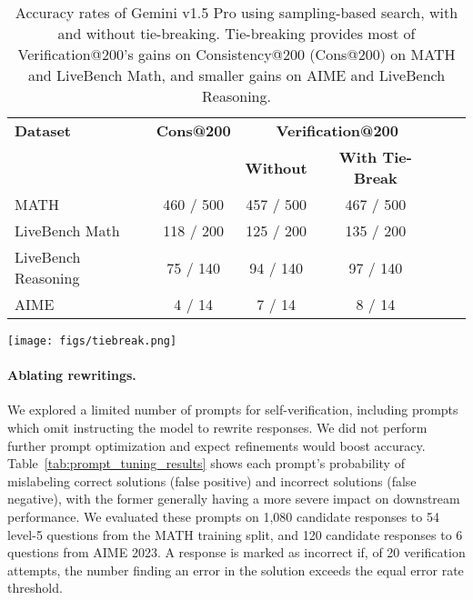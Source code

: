 \begin{table}[htbp]
\centering
\begin{minipage}[c]{0.68\textwidth}
\vspace{0cm}
\begin{tabular}{lccccc}
\toprule
\textbf{Dataset} & \textbf{Cons@200} & \multicolumn{2}{c}{\textbf{Verification@200}} \\
                 &                   & \textbf{Without} & \textbf{With Tie-Break} \\
\midrule
MATH              & {460} / {500}   & {457} / {500}   & {467} / {500} \\
LiveBench Math        & {118} / {200}   & {125} / {200}   & {135} / {200} \\
LiveBench Reasoning & {75} / {140}    & {94} / {140}    & {97} / {140} \\
AIME              & {4} / {14}      & {7} / {14}      & {8} / {14}   \\
\bottomrule
\end{tabular}
\end{minipage}
\hfill
\begin{minipage}[c]{0.31\textwidth}
\vspace{0cm}
\texttt{[image: figs/tiebreak.png]}
\end{minipage}

\caption{Accuracy rates of Gemini v1.5 Pro using sampling-based search, with and without tie-breaking.
Tie-breaking provides most of Verification@200's gains on Consistency@200 (Cons@200) on MATH and LiveBench Math, and smaller gains on AIME and LiveBench Reasoning.
}
\label{tab:ablation}
\end{table}


\paragraph{Ablating rewritings.}
We explored a limited number of prompts for self-verification, including prompts which omit instructing the model to rewrite responses.
We did not perform further prompt optimization and expect refinements would boost accuracy.
Table~\ref{tab:prompt_tuning_results} shows each prompt’s probability of mislabeling correct solutions (false positive) and incorrect solutions (false negative), with the former generally having a more severe impact on downstream performance.
We evaluated these prompts on 1,080 candidate responses to 54 level-5 questions from the MATH training split, and 120 candidate responses to 6 questions from AIME 2023.
A response is marked as incorrect if, of 20 verification attempts, the number finding an error in the solution exceeds the equal error rate threshold.


